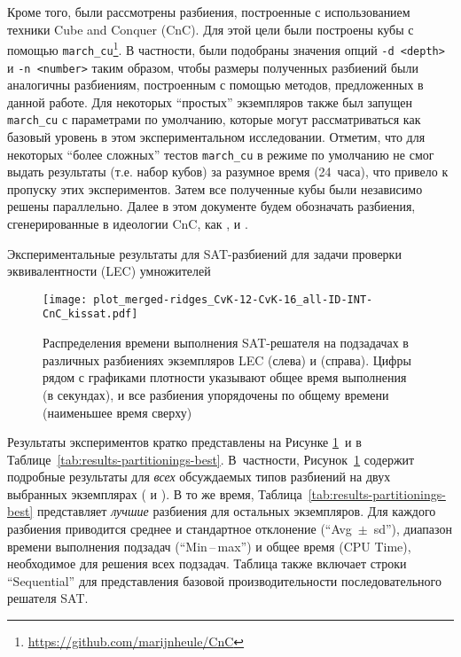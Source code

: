 Кроме того, были рассмотрены разбиения, построенные с использованием техники Cube and Conquer (CnC).
Для этой цели были построены кубы с помощью \texttt{march\_cu}\footnote{\url{https://github.com/marijnheule/CnC}}.
В частности, были подобраны значения опций \texttt{-d <depth>} и \texttt{-n <number>} таким образом, чтобы размеры полученных разбиений были аналогичны разбиениям, построенным с помощью методов, предложенных в данной работе.
Для некоторых \enquote{простых} экземпляров также был запущен \texttt{march\_cu} с параметрами по умолчанию, которые могут рассматриваться как базовый уровень в этом экспериментальном исследовании.
Отметим, что для некоторых \enquote{более сложных} тестов \texttt{march\_cu} в режиме по умолчанию не смог выдать результаты (т.е. набор кубов) за разумное время (24~часа), что привело к пропуску этих экспериментов.
Затем все полученные кубы были независимо решены параллельно.
Далее в этом документе будем обозначать разбиения, сгенерированные в идеологии CnC, как ,  и .

\begin{table}[!ht]
    \centering
    \caption{Экспериментальные результаты для SAT-разбиений для задачи проверки эквивалентности (LEC) умножителей}
    \label{tab:results-partitionings-best}
    
\end{table}

\begin{figure}[!ht]
    \centering
    \texttt{[image: plot\_merged-ridges\_CvK-12-CvK-16\_all-ID-INT-CnC\_kissat.pdf]}
    \caption{Распределения времени выполнения SAT-решателя на подзадачах в различных разбиениях экземпляров LEC  (слева) и  (справа). Цифры рядом с графиками плотности указывают общее время выполнения (в секундах), и все разбиения упорядочены по общему времени (наименьшее время сверху)}
    \label{fig:ridges}
\end{figure}

Результаты экспериментов кратко представлены на Рисунке \ref{fig:ridges}~и в Таблице~\ref{tab:results-partitionings-best}.
В~частности, Рисунок~\ref{fig:ridges} содержит
подробные результаты для \textit{всех} обсуждаемых типов разбиений на двух выбранных экземплярах ( и ).
В то же время, Таблица~\ref{tab:results-partitionings-best} представляет \emph{лучшие} разбиения для остальных экземпляров.
Для каждого разбиения приводится среднее и стандартное отклонение (\enquote{Avg~$\pm$~sd}), диапазон времени выполнения подзадач (\enquote{Min\,--\,max}) и общее  время (CPU Time), необходимое для решения всех подзадач.
Таблица также включает строки \enquote{Sequential} для представления базовой производительности последовательного решателя SAT.

